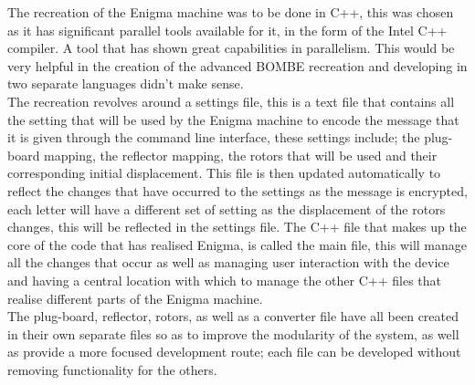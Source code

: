 \documentclass[12pt,a4paper]{article}
\begin{document}
The recreation of the Enigma machine was to be done in C++, this was chosen as it has significant parallel tools available for it, in the form of the Intel C++ compiler. A tool that has shown great capabilities in parallelism. This would be very helpful in the creation of the advanced BOMBE recreation and developing in two separate languages didn't make sense.\\

The recreation revolves around a settings file, this is a text file that contains all the setting that will be used by the Enigma machine to encode the message that it is given through the command line interface, these settings include; the plug-board mapping, the reflector mapping, the rotors that will be used and their corresponding initial displacement. This file is then updated automatically to reflect the changes that have occurred to the settings as the message is encrypted, each letter will have a different set of setting as the displacement of the rotors changes, this will be reflected in the settings file. The C++ file that makes up the core of the code that has realised Enigma, is called the main file, this will manage all the changes that occur as well as managing user interaction with the device and having a central location with which to manage the other C++ files that realise different parts of the Enigma machine.\\

The plug-board, reflector, rotors, as well as a converter file have all been created in their own separate files so as to improve the modularity of the system, as well as provide a more focused development route; each file can be developed without removing functionality for the others.\\
\end{document}
